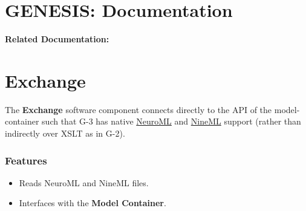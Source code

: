 \documentclass[12pt]{article}
\begin{document}
\section*{GENESIS: Documentation}

{\bf Related Documentation:}

\section*{Exchange}

The {\bf Exchange} software component connects directly to the API of
the model-container such that G-3 has native
\href{http://www.neuroml.org/}{NeuroML} and
\href{http://www.nineml.org/}{NineML} support (rather than indirectly
over XSLT as in G-2).


\subsubsection*{Features}

\begin{itemize}

\item Reads NeuroML and NineML files.

\item Interfaces with the {\bf Model Container}.

\end{itemize}
\end{document}
